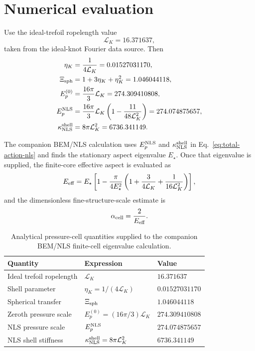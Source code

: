 \documentclass[11pt]{article}
\newcommand{\EpNLS}{E_p^{\rm NLS}}
\newcommand{\kappaNLS}{\kappa_{\rm NLS}^{\rm shell}}
\begin{document}
\section{Numerical evaluation}
\label{sec:numerical-evaluation}

Use the ideal-trefoil ropelength value
\begin{equation}
  \mathcal L_K = 16.371637,
\end{equation}
taken from the ideal-knot Fourier data source.  Then
\begin{align}
  \eta_K &= \frac{1}{4\mathcal L_K}=0.01527031170,\\
  \Xi_{\rm sph} &= 1+3\eta_K+\eta_K^2=1.046044118,\\
  E_p^{(0)} &= \frac{16\pi}{3}\mathcal L_K=274.309410808,\\
  \EpNLS
  &=
  \frac{16\pi}{3}\mathcal L_K
  \left(1-\frac{11}{48\mathcal L_K^2}\right)
  =
  274.074875657,\\
  \kappaNLS &= 8\pi\mathcal L_K^2=6736.341149.
\end{align}

The companion BEM/NLS calculation uses \(\EpNLS\) and \(\kappaNLS\) in
Eq.~\eqref{eq:total-action-nls} and finds the stationary aspect eigenvalue \(E_\star\).  Once
that eigenvalue is supplied, the finite-core effective aspect is evaluated as
\begin{equation}
  E_{\rm eff}
  =
  E_\star
  \left[
  1-
  \frac{\pi}{4E_\star^2}
  \left(
  1+\frac{3}{4\mathcal L_K}+\frac{1}{16\mathcal L_K^2}
  \right)
  \right],
  \label{eq:Eeff-star}
\end{equation}
and the dimensionless fine-structure-scale estimate is
\begin{equation}
  \alpha_{\rm cell}=\frac{2}{E_{\rm eff}}.
  \label{eq:alpha-star}
\end{equation}

\begin{table}[h]
\centering
\caption{Analytical pressure-cell quantities supplied to the companion BEM/NLS finite-cell eigenvalue calculation.}
\begin{tabular}{@{}lll@{}}
\toprule
Quantity & Expression & Value \\
\midrule
Ideal trefoil ropelength & \(\mathcal L_K\) & \(16.371637\) \\
Shell parameter & \(\eta_K=1/(4\mathcal L_K)\) & \(0.01527031170\) \\
Spherical transfer & \(\Xi_{\rm sph}\) & \(1.046044118\) \\
Zeroth pressure scale & \(E_p^{(0)}=(16\pi/3)\mathcal L_K\) & \(274.309410808\) \\
NLS pressure scale & \(\EpNLS\) & \(274.074875657\) \\
NLS shell stiffness & \(\kappaNLS=8\pi\mathcal L_K^2\) & \(6736.341149\) \\
\bottomrule
\end{tabular}
\label{tab:nls-pressure}
\end{table}
\end{document}
